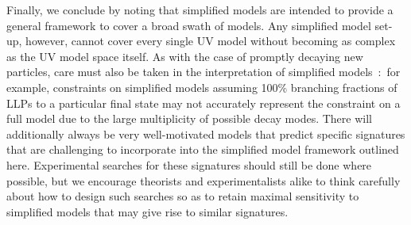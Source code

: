 Finally, we conclude by noting that simplified models are intended to provide a general framework to cover a broad swath of models.
Any simplified model set-up, however, cannot cover every single UV model without becoming as complex as the UV model space itself. As with the case of promptly decaying new particles, care must also be taken in the interpretation of simplified models~\cite{Alves:2011wf,Abdallah:2015ter,Abercrombie:2015wmb,Boveia:2016mrp,Ambrogi:2017lov}:~for example, constraints on simplified models assuming 100\% branching fractions of LLPs to a particular final state may not accurately represent the constraint on a full model due to the large multiplicity of possible decay modes.
There will additionally always be very well-motivated models that predict specific signatures that are challenging to incorporate into the simplified model framework outlined here.
Experimental searches for these signatures should still be done where possible, but we encourage theorists and experimentalists alike to think carefully about how to design such searches so as to retain maximal sensitivity to simplified models that may give rise to similar signatures.
